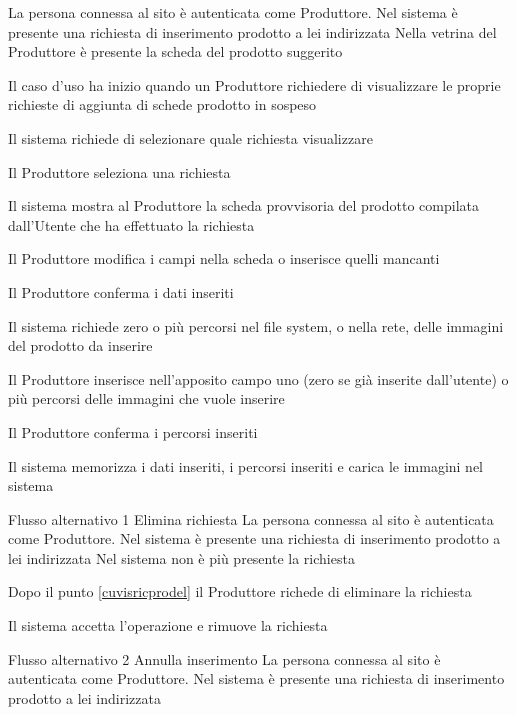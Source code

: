 {}
{La persona connessa al sito è autenticata come Produttore. Nel sistema è presente una richiesta di inserimento prodotto a lei indirizzata}
{Nella vetrina del Produttore è presente la scheda del prodotto suggerito}
{\begin{enumCU}
		\item Il caso d'uso ha inizio quando un Produttore richiedere di visualizzare le proprie richieste di aggiunta di schede prodotto in sospeso
		\item Il sistema richiede di selezionare quale richiesta visualizzare
		\item Il Produttore seleziona una richiesta
		\item Il sistema mostra al Produttore la scheda provvisoria del prodotto compilata dall'Utente che ha effettuato la richiesta \label{cuvisricprodel}
		\item Il Produttore modifica i campi nella scheda o inserisce quelli mancanti \label{cuvisricpro:1}
		\item Il Produttore conferma i dati inseriti
		\item Il sistema richiede zero o più percorsi nel file system, o nella rete, delle immagini del prodotto da inserire
		\item Il Produttore inserisce nell'apposito campo uno (zero se già inserite dall'utente) o più percorsi delle immagini che vuole inserire \label{cuvisricpro:2}
		\item Il Produttore conferma i percorsi inseriti \label{cuvisricpro:3}
		\item Il sistema memorizza i dati inseriti, i percorsi inseriti e carica le immagini nel sistema
	\end{enumCU}}
%
{Flusso alternativo 1}%
{Elimina richiesta}%
{La persona connessa al sito è autenticata come Produttore. Nel sistema è presente una richiesta di inserimento prodotto a lei indirizzata}
{Nel sistema non è più presente la richiesta}%
{\begin{enumCU}
		\item Dopo il punto \ref{cuvisricprodel} il Produttore richede di eliminare la richiesta
		\item Il sistema accetta l'operazione e rimuove la richiesta
	\end{enumCU}}%
%
{Flusso alternativo 2}%
{Annulla inserimento}%
{La persona connessa al sito è autenticata come Produttore. Nel sistema è presente una richiesta di inserimento prodotto a lei indirizzata}
